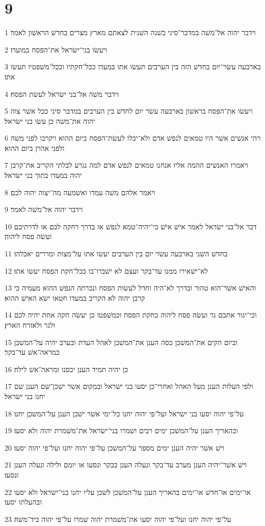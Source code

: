 \chapter{9}

\par 1 וידבר יהוה אל־משׁה במדבר־סיני בשׁנה השׁנית לצאתם מארץ מצרים בחדשׁ הראשׁון לאמר׃
\par 2 ויעשׂו בני־ישׂראל את־הפסח במועדו׃
\par 3 בארבעה עשׂר־יום בחדשׁ הזה בין הערבים תעשׂו אתו במעדו ככל־חקתיו וככל־משׁפטיו תעשׂו אתו׃
\par 4 וידבר משׁה אל־בני ישׂראל לעשׂת הפסח׃
\par 5 ויעשׂו את־הפסח בראשׁון בארבעה עשׂר יום לחדשׁ בין הערבים במדבר סיני ככל אשׁר צוה יהוה את־משׁה כן עשׂו בני ישׂראל׃
\par 6 ויהי אנשׁים אשׁר היו טמאים לנפשׁ אדם ולא־יכלו לעשׂת־הפסח ביום ההוא ויקרבו לפני משׁה ולפני אהרן ביום ההוא׃
\par 7 ויאמרו האנשׁים ההמה אליו אנחנו טמאים לנפשׁ אדם למה נגרע לבלתי הקריב את־קרבן יהוה במעדו בתוך בני ישׂראל׃
\par 8 ויאמר אלהם משׁה עמדו ואשׁמעה מה־יצוה יהוה לכם׃
\par 9 וידבר יהוה אל־משׁה לאמר׃
\par 10 דבר אל־בני ישׂראל לאמר אישׁ אישׁ כי־יהיה־טמא לנפשׁ או בדרך רחקה לכם או לדרתיכם ועשׂה פסח ליהוה׃
\par 11 בחדשׁ השׁני בארבעה עשׂר יום בין הערבים יעשׂו אתו על־מצות ומררים יאכלהו׃
\par 12 לא־ישׁאירו ממנו עד־בקר ועצם לא ישׁברו־בו ככל־חקת הפסח יעשׂו אתו׃
\par 13 והאישׁ אשׁר־הוא טהור ובדרך לא־היה וחדל לעשׂות הפסח ונכרתה הנפשׁ ההוא מעמיה כי קרבן יהוה לא הקריב במעדו חטאו ישׂא האישׁ ההוא׃
\par 14 וכי־יגור אתכם גר ועשׂה פסח ליהוה כחקת הפסח וכמשׁפטו כן יעשׂה חקה אחת יהיה לכם ולגר ולאזרח הארץ׃
\par 15 וביום הקים את־המשׁכן כסה הענן את־המשׁכן לאהל העדת ובערב יהיה על־המשׁכן כמראה־אשׁ עד־בקר׃
\par 16 כן יהיה תמיד הענן יכסנו ומראה־אשׁ לילה׃
\par 17 ולפי העלות הענן מעל האהל ואחרי־כן יסעו בני ישׂראל ובמקום אשׁר ישׁכן־שׁם הענן שׁם יחנו בני ישׂראל׃
\par 18 על־פי יהוה יסעו בני ישׂראל ועל־פי יהוה יחנו כל־ימי אשׁר ישׁכן הענן על־המשׁכן יחנו׃
\par 19 ובהאריך הענן על־המשׁכן ימים רבים ושׁמרו בני־ישׂראל את־משׁמרת יהוה ולא יסעו׃
\par 20 וישׁ אשׁר יהיה הענן ימים מספר על־המשׁכן על־פי יהוה יחנו ועל־פי יהוה יסעו׃
\par 21 וישׁ אשׁר־יהיה הענן מערב עד־בקר ונעלה הענן בבקר ונסעו או יומם ולילה ונעלה הענן ונסעו׃
\par 22 או־ימים או־חדשׁ או־ימים בהאריך הענן על־המשׁכן לשׁכן עליו יחנו בני־ישׂראל ולא יסעו ובהעלתו יסעו׃
\par 23 על־פי יהוה יחנו ועל־פי יהוה יסעו את־משׁמרת יהוה שׁמרו על־פי יהוה ביד־משׁה׃

